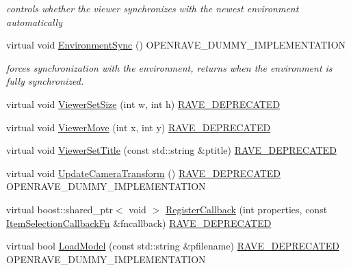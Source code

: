 \begin{DoxyCompactItemize}
\begin{DoxyCompactList}\small\item\em controls whether the viewer synchronizes with the newest environment automatically \item\end{DoxyCompactList}\item 
virtual void \hyperlink{classOpenRAVE_1_1ViewerBase_a252e5291c15eb4d6956ee5c824a4c56d}{EnvironmentSync} () OPENRAVE\_\-DUMMY\_\-IMPLEMENTATION
\begin{DoxyCompactList}\small\item\em forces synchronization with the environment, returns when the environment is fully synchronized. \item\end{DoxyCompactList}\item 
virtual void \hyperlink{classOpenRAVE_1_1ViewerBase_a93a7763493f3da4687ca55db4a32b05e}{ViewerSetSize} (int w, int h) \hyperlink{classOpenRAVE_1_1ViewerBase_ab0582044ee7b7222de5e7406ad64f93a}{RAVE\_\-DEPRECATED}
\item 
virtual void \hyperlink{classOpenRAVE_1_1ViewerBase_a00e98066bc03fa4d2b287d2a6a2d2b4c}{ViewerMove} (int x, int y) \hyperlink{classOpenRAVE_1_1ViewerBase_ab0582044ee7b7222de5e7406ad64f93a}{RAVE\_\-DEPRECATED}
\item 
virtual void \hyperlink{classOpenRAVE_1_1ViewerBase_adfc56134be2ef5b157c9a0b55d5d4e13}{ViewerSetTitle} (const std::string \&ptitle) \hyperlink{classOpenRAVE_1_1ViewerBase_ab0582044ee7b7222de5e7406ad64f93a}{RAVE\_\-DEPRECATED}
\item 
virtual void \hyperlink{classOpenRAVE_1_1ViewerBase_a8ba08e058dbbaf19090cc79cd22055f6}{UpdateCameraTransform} () \hyperlink{classOpenRAVE_1_1ViewerBase_ab0582044ee7b7222de5e7406ad64f93a}{RAVE\_\-DEPRECATED} OPENRAVE\_\-DUMMY\_\-IMPLEMENTATION
\item 
virtual boost::shared\_\-ptr$<$ void $>$ \hyperlink{classOpenRAVE_1_1ViewerBase_a87bb8fc16f70e17fc3955a734a5a9cc5}{RegisterCallback} (int properties, const \hyperlink{classOpenRAVE_1_1ViewerBase_aab6d9553843a6d593ee530045d7fff9f}{ItemSelectionCallbackFn} \&fncallback) \hyperlink{classOpenRAVE_1_1ViewerBase_ab0582044ee7b7222de5e7406ad64f93a}{RAVE\_\-DEPRECATED}
\item 
virtual bool \hyperlink{classOpenRAVE_1_1ViewerBase_a4b6920a362f58dfd5113a5163266780d}{LoadModel} (const std::string \&pfilename) \hyperlink{classOpenRAVE_1_1ViewerBase_ab0582044ee7b7222de5e7406ad64f93a}{RAVE\_\-DEPRECATED} OPENRAVE\_\-DUMMY\_\-IMPLEMENTATION
\end{DoxyCompactItemize}
